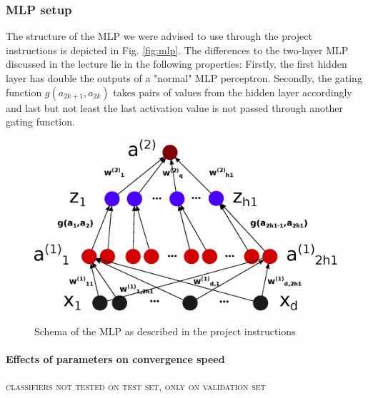 \subsubsection{MLP setup}
The structure of the MLP we were advised to use through the project instructions is depicted in Fig. \ref{fig:mlp}. The differences to the two-layer MLP discussed in the lecture lie in the following properties: Firstly, the first hidden layer has double the outputs of a "normal" MLP perceptron. Secondly, the gating function $g(a_{2k+1}, a_{2k})$ takes pairs of values from the hidden layer accordingly and last but not least the last activation value is not passed through another gating function.
\begin{figure}[!h]
	\centering
	\includegraphics[width=.6\textwidth]{mlp/mlp.eps}
	\label{mlp}
	\caption{Schema of the MLP as described in the project instructions}
\end{figure}
\newline
%

\paragraph{Effects of parameters on convergence speed}
\textsc{classifiers not tested on test set, only on validation set}

